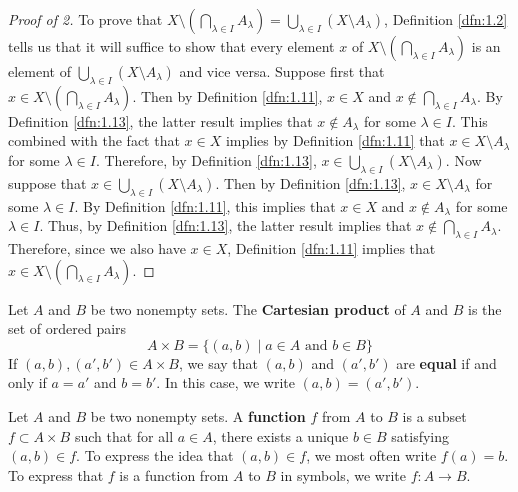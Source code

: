 \documentclass[../main.tex]{subfiles}
\begin{document}
\begin{theorem}
\begin{proof}[Proof of 2]
        To prove that $X\setminus\left( \bigcap_{\lambda\in I}A_\lambda \right)=\bigcup_{\lambda\in I}(X\setminus A_\lambda)$, Definition \ref{dfn:1.2} tells us that it will suffice to show that every element $x$ of $X\setminus\left( \bigcap_{\lambda\in I}A_\lambda \right)$ is an element of $\bigcup_{\lambda\in I}(X\setminus A_\lambda)$ and vice versa. Suppose first that $x\in X\setminus\left( \bigcap_{\lambda\in I}A_\lambda \right)$. Then by Definition \ref{dfn:1.11}, $x\in X$ and $x\notin\bigcap_{\lambda\in I}A_\lambda$. By Definition \ref{dfn:1.13}, the latter result implies that $x\notin A_\lambda$ for some $\lambda\in I$. This combined with the fact that $x\in X$ implies by Definition \ref{dfn:1.11} that $x\in X\setminus A_\lambda$ for some $\lambda\in I$. Therefore, by Definition \ref{dfn:1.13}, $x\in\bigcup_{\lambda\in I}(X\setminus A_\lambda)$. Now suppose that $x\in\bigcup_{\lambda\in I}(X\setminus A_\lambda)$. Then by Definition \ref{dfn:1.13}, $x\in X\setminus A_\lambda$ for some $\lambda\in I$. By Definition \ref{dfn:1.11}, this implies that $x\in X$ and $x\notin A_\lambda$ for some $\lambda\in I$. Thus, by Definition \ref{dfn:1.13}, the latter result implies that $x\notin\bigcap_{\lambda\in I}A_\lambda$. Therefore, since we also have $x\in X$, Definition \ref{dfn:1.11} implies that $x\in X\setminus\left( \bigcap_{\lambda\in I}A_\lambda \right)$.
    \end{proof}
\end{theorem}

\begin{definition}\label{dfn:1.15}
    Let $A$ and $B$ be two nonempty sets. The \textbf{Cartesian product} of $A$ and $B$ is the set of ordered pairs
    \begin{equation*}
        A\times B = \{(a,b)\mid a\in A\text{ and }b\in B\}
    \end{equation*}
    If $(a,b),(a',b')\in A\times B$, we say that $(a,b)$ and $(a',b')$ are \textbf{equal} if and only if $a=a'$ and $b=b'$. In this case, we write $(a,b)=(a',b')$.
\end{definition}

\begin{definition}\label{dfn:1.16}
    Let $A$ and $B$ be two nonempty sets. A \textbf{function} $f$ from $A$ to $B$ is a subset $f\subset A\times B$ such that for all $a\in A$, there exists a unique $b\in B$ satisfying $(a,b)\in f$. To express the idea that $(a,b)\in f$, we most often write $f(a)=b$. To express that $f$ is a function from $A$ to $B$ in symbols, we write $f:A\to B$.
\end{definition}
\end{document}
